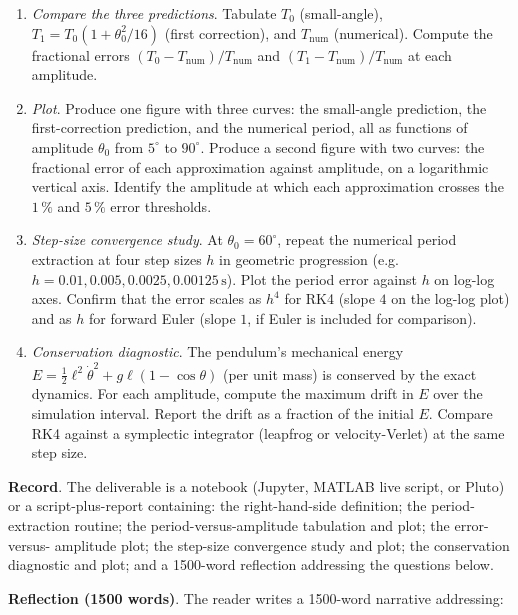 \begin{project}
\begin{enumerate}[leftmargin=*]
  \item \emph{Compare the three predictions}. Tabulate $T_{0}$
    (small-angle), $T_{1} = T_{0}(1 + \theta_{0}^{2}/16)$ (first
    correction), and $T_{\text{num}}$ (numerical). Compute the
    fractional errors $(T_{0} - T_{\text{num}})/T_{\text{num}}$
    and $(T_{1} - T_{\text{num}})/T_{\text{num}}$ at each
    amplitude.

  \item \emph{Plot}. Produce one figure with three curves: the
    small-angle prediction, the first-correction prediction, and
    the numerical period, all as functions of amplitude
    $\theta_{0}$ from $5^{\circ}$ to $90^{\circ}$. Produce a
    second figure with two curves: the fractional error of each
    approximation against amplitude, on a logarithmic vertical
    axis. Identify the amplitude at which each approximation
    crosses the $1\,\%$ and $5\,\%$ error thresholds.

  \item \emph{Step-size convergence study}. At
    $\theta_{0} = 60^{\circ}$, repeat the numerical period
    extraction at four step sizes $h$ in geometric progression
    (e.g.\ $h = 0.01, 0.005, 0.0025, 0.00125\,\si{\second}$).
    Plot the period error against $h$ on log-log axes. Confirm
    that the error scales as $h^{4}$ for RK4 (slope $4$ on the
    log-log plot) and as $h$ for forward Euler (slope $1$, if
    Euler is included for comparison).

  \item \emph{Conservation diagnostic}. The pendulum's mechanical
    energy $E = \tfrac{1}{2}\ell^{2}\dot\theta^{2} + g\ell(1 -
    \cos\theta)$ (per unit mass) is conserved by the exact
    dynamics. For each amplitude, compute the maximum drift in
    $E$ over the simulation interval. Report the drift as a
    fraction of the initial $E$. Compare RK4 against a symplectic
    integrator (leapfrog or velocity-Verlet) at the same step
    size.
\end{enumerate}

\textbf{Record}. The deliverable is a notebook (Jupyter, MATLAB
live script, or Pluto) or a script-plus-report containing: the
right-hand-side definition; the period-extraction routine; the
period-versus-amplitude tabulation and plot; the error-versus-
amplitude plot; the step-size convergence study and plot; the
conservation diagnostic and plot; and a 1500-word reflection
addressing the questions below.

\textbf{Reflection (1500 words)}. The reader writes a 1500-word
narrative addressing:


\end{project}
